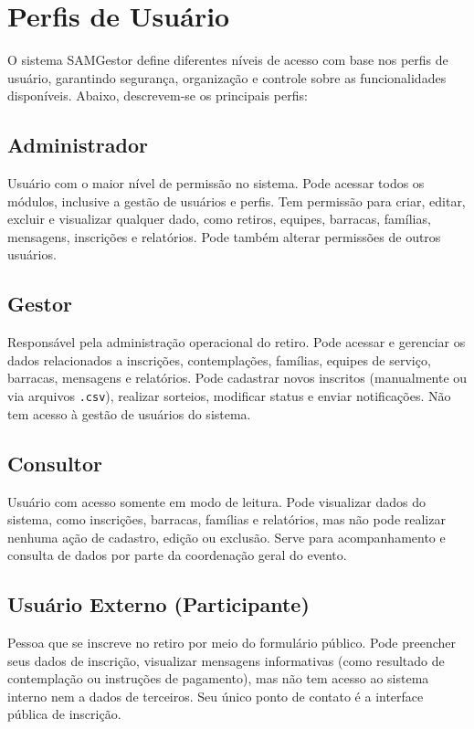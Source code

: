 \section{Perfis de Usuário}

O sistema SAMGestor define diferentes níveis de acesso com base nos perfis de usuário, garantindo segurança, organização e controle sobre as funcionalidades disponíveis. Abaixo, descrevem-se os principais perfis:

\subsection*{Administrador}
Usuário com o maior nível de permissão no sistema. Pode acessar todos os módulos, inclusive a gestão de usuários e perfis. Tem permissão para criar, editar, excluir e visualizar qualquer dado, como retiros, equipes, barracas, famílias, mensagens, inscrições e relatórios. Pode também alterar permissões de outros usuários.

\subsection*{Gestor}
Responsável pela administração operacional do retiro. Pode acessar e gerenciar os dados relacionados a inscrições, contemplações, famílias, equipes de serviço, barracas, mensagens e relatórios. Pode cadastrar novos inscritos (manualmente ou via arquivos \texttt{.csv}), realizar sorteios, modificar status e enviar notificações. Não tem acesso à gestão de usuários do sistema.

\subsection*{Consultor}
Usuário com acesso somente em modo de leitura. Pode visualizar dados do sistema, como inscrições, barracas, famílias e relatórios, mas não pode realizar nenhuma ação de cadastro, edição ou exclusão. Serve para acompanhamento e consulta de dados por parte da coordenação geral do evento.

\subsection*{Usuário Externo (Participante)}
Pessoa que se inscreve no retiro por meio do formulário público. Pode preencher seus dados de inscrição, visualizar mensagens informativas (como resultado de contemplação ou instruções de pagamento), mas não tem acesso ao sistema interno nem a dados de terceiros. Seu único ponto de contato é a interface pública de inscrição.
